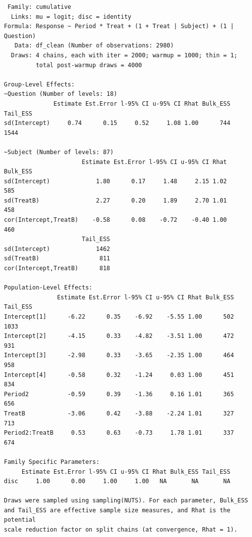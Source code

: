 \documentclass[
  12pt,
  a4paper,
  extrafontsizes,
  onecolumn,
  openright]{memoir}
\begin{document}
\begin{verbatim}
 Family: cumulative 
  Links: mu = logit; disc = identity 
Formula: Response ~ Period * Treat + (1 + Treat | Subject) + (1 | Question) 
   Data: df_clean (Number of observations: 2980) 
  Draws: 4 chains, each with iter = 2000; warmup = 1000; thin = 1;
         total post-warmup draws = 4000

Group-Level Effects: 
~Question (Number of levels: 18) 
              Estimate Est.Error l-95% CI u-95% CI Rhat Bulk_ESS Tail_ESS
sd(Intercept)     0.74      0.15     0.52     1.08 1.00      744     1544

~Subject (Number of levels: 87) 
                      Estimate Est.Error l-95% CI u-95% CI Rhat Bulk_ESS
sd(Intercept)             1.80      0.17     1.48     2.15 1.02      585
sd(TreatB)                2.27      0.20     1.89     2.70 1.01      458
cor(Intercept,TreatB)    -0.58      0.08    -0.72    -0.40 1.00      460
                      Tail_ESS
sd(Intercept)             1462
sd(TreatB)                 811
cor(Intercept,TreatB)      818

Population-Level Effects: 
               Estimate Est.Error l-95% CI u-95% CI Rhat Bulk_ESS Tail_ESS
Intercept[1]      -6.22      0.35    -6.92    -5.55 1.00      502     1033
Intercept[2]      -4.15      0.33    -4.82    -3.51 1.00      472      931
Intercept[3]      -2.98      0.33    -3.65    -2.35 1.00      464      958
Intercept[4]      -0.58      0.32    -1.24     0.03 1.00      451      834
Period2           -0.59      0.39    -1.36     0.16 1.01      365      656
TreatB            -3.06      0.42    -3.88    -2.24 1.01      327      713
Period2:TreatB     0.53      0.63    -0.73     1.78 1.01      337      674

Family Specific Parameters: 
     Estimate Est.Error l-95% CI u-95% CI Rhat Bulk_ESS Tail_ESS
disc     1.00      0.00     1.00     1.00   NA       NA       NA

Draws were sampled using sampling(NUTS). For each parameter, Bulk_ESS
and Tail_ESS are effective sample size measures, and Rhat is the potential
scale reduction factor on split chains (at convergence, Rhat = 1).
\end{verbatim}
\end{document}
